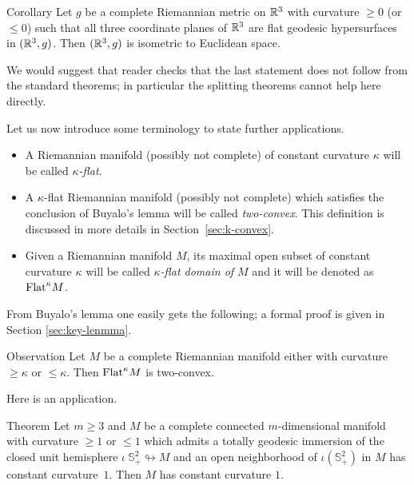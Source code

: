 \documentclass[oneside,a4paper]{article}
\begin{document}
\begin{thm}{Corollary}
Let $g$ be a complete Riemannian metric on $\mathbb{R}^3$ with curvature $\ge 0$ (or $\le 0$)
such that all three coordinate planes of $\mathbb{R}^3$
are flat geodesic hypersurfaces in $(\mathbb{R}^3,g)$.
Then $(\mathbb{R}^3,g)$ is isometric to Euclidean space.
\end{thm}

We would suggest that reader checks that the last statement does not follow from the standard theorems;
in particular the splitting theorems cannot help here directly.

\medskip

Let us now introduce some terminology to state further applications.
\begin{itemize}
\item A Riemannian manifold (possibly not complete) of constant curvature $\kappa$ will be called \emph{$\kappa$-flat}.
\item A $\kappa$-flat Riemannian manifold (possibly not complete)
which satisfies the conclusion of Buyalo's lemma will be called \emph{two-convex}.
This definition is discussed in more details in Section~\ref{sec:k-convex}.
\item Given a Riemannian manifold $M$, its maximal open subset of constant curvature $\kappa$ will be called \emph{$\kappa$-flat domain of $M$}
and it will be denoted as $\mathrm{Flat}^\kappa M$.
\end{itemize}

From Buyalo's lemma one easily gets the following;
a formal proof is given in Section \ref{sec:key-lenmma}.

\begin{thm}{Observation}\label{obs:flat-domain}
Let $M$ be a complete Riemannian manifold either with curvature $\ge \kappa$ or $\le \kappa$.
Then $\mathrm{Flat}^\kappa M$ is two-convex.
\end{thm}

Here is an application.

\begin{thm}{Theorem}\label{thm:rigid-sphere}
Let $m\ge 3$ and $M$ be a complete connected $m$-dimensional manifold
with curvature $\ge 1$ or $\le 1$ which admits a totally geodesic immersion of the closed unit hemisphere $\iota\:\mathbb S^2_+\looparrowright M$
and an open neighborhood of $\iota(\mathbb S^2_+)$ in $M$ has constant curvature~$1$.
Then $M$ has constant curvature $1$.
\end{thm}
\end{document}
